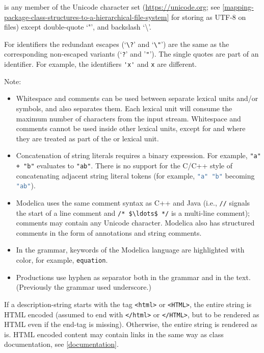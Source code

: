  is any member of the Unicode character set (\url{https://unicode.org}; see \cref{mapping-package-class-structures-to-a-hierarchical-file-system} for storing as UTF-8 on files) except double-quote `"', and backslash `\textbackslash{}'.

For identifiers the redundant escapes (`\lstinline!\?!' and `\lstinline!\"!') are the same as the corresponding non-escaped variants (`\lstinline!?!' and '\lstinline!"!').
The single quotes are part of an identifier.
For example, the identifiers \lstinline!'x'! and \lstinline!x! are different.

Note:
\begin{itemize}
\item
  Whitespace and comments can be used between separate lexical units and/or symbols, and also separates them.
  Each lexical unit will consume the maximum number of characters from the input stream.
  Whitespace and comments cannot be used inside other lexical units, except for  and  where they are treated as part of the  or  lexical unit.
\item
  Concatenation of string literals requires a binary expression.
  For example, \lstinline!"a" + "b"! evaluates to \lstinline!"ab"!.
  There is no support for the C/C++ style of concatenating adjacent string literal tokens (for example, \lstinline[language=C]!"a" "b"! becoming \lstinline[language=C]!"ab"!).
\item
  Modelica uses the same comment syntax as C++ and Java (i.e., \lstinline!//! signals the start of a line comment and \lstinline!/* $\ldots$ */! is a multi-line comment); comments may contain any Unicode character.
  Modelica also has structured comments in the form of annotations and string comments.
\item
  In the grammar, keywords of the Modelica language are highlighted with color, for example, \lstinline[language=grammar]!equation!.
\item
  Productions use hyphen as separator both in the grammar and in the text.
  (Previously the grammar used underscore.)
\end{itemize}

If a description-string starts with the tag \lstinline!<html>! or \lstinline!<HTML>!, the entire string is HTML encoded (assumed to end with \lstinline!</html>! or \lstinline!</HTML>!, but to be rendered as HTML even if the end-tag is missing).
Otherwise, the entire string is rendered as is.
HTML encoded content may contain links in the same way as class documentation, see \cref{documentation}.


